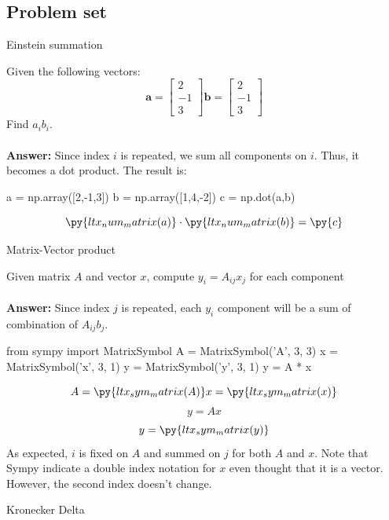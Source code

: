 \subsection{Problem set}

\begin{problem}
    Einstein summation
\end{problem}
    Given the following vectors:
    $$
        \mathbf{a} = 
        \begin{bmatrix}
            2 \\ -1 \\ 3    
        \end{bmatrix}
        \mathbf{b} = 
        \begin{bmatrix}
            2 \\ -1 \\ 3    
        \end{bmatrix}
    $$
    Find $a_ib_i$. \\\\ \textbf{Answer:} Since index $i$ is repeated, we sum all components on $i$. Thus, it becomes a dot product. The result is:
\begin{pyblock}
a = np.array([2,-1,3])
b = np.array([1,4,-2])
c = np.dot(a,b)
\end{pyblock}

$$
\py{ltx_num_matrix(a)} \cdot \py{ltx_num_matrix(b)} = \py{c}
$$

\begin{problem}
    Matrix-Vector product    
\end{problem}

Given matrix $A$ and vector $x$, compute $y_i = A_{ij}x_j$ for each component
\\\\
\textbf{Answer: }Since index $j$ is repeated, each $y_i$ component will be a sum of combination of $A_{ij}b_j$.
\begin{pyblock}
from sympy import MatrixSymbol
A = MatrixSymbol('A', 3, 3)
x = MatrixSymbol('x', 3, 1)
y = MatrixSymbol('y', 3, 1)
y = A * x
\end{pyblock}
$$
A = \py{ltx_sym_matrix(A)}
x = \py{ltx_sym_matrix(x)}
$$
$$
y = Ax
$$
$$
y = \py{ltx_sym_matrix(y)}
$$
As expected, $i$ is fixed on $A$ and summed on $j$ for both $A$ and $x$. Note that Sympy indicate a double index notation for $x$ even thought that it is a vector. However, the second index doesn't change.


\begin{problem}
    Kronecker Delta
\end{problem}

